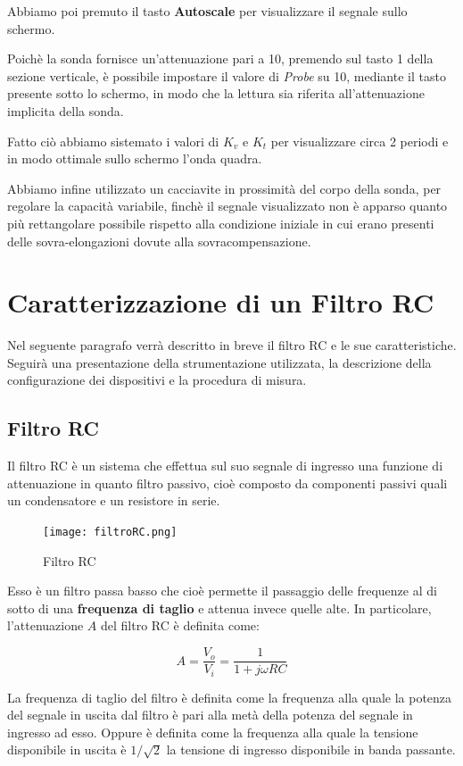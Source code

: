 Abbiamo poi premuto il tasto \textbf{Autoscale} per visualizzare il segnale sullo schermo.

Poichè la sonda fornisce un'attenuazione pari a 10, premendo sul tasto 1 della sezione verticale, è possibile impostare il valore di \emph{Probe} su 10, mediante il tasto presente sotto lo schermo, in modo che la lettura sia riferita all'attenuazione implicita della sonda.

Fatto ciò abbiamo sistemato i valori di $K_v$ e $K_t$ per visualizzare circa 2 periodi e in modo ottimale sullo schermo l'onda quadra.

Abbiamo infine utilizzato un cacciavite in prossimità del corpo della sonda, per regolare la capacità variabile, finchè il segnale visualizzato non è apparso quanto più rettangolare possibile rispetto alla condizione iniziale in cui erano presenti delle sovra-elongazioni dovute alla sovracompensazione.


\clearpage
\section{Caratterizzazione di un Filtro RC} \label{sec:filtroRC}
Nel seguente paragrafo verrà descritto in breve il filtro RC e le sue caratteristiche. Seguirà una presentazione della strumentazione utilizzata, la descrizione della configurazione dei dispositivi e la procedura di misura.

\subsection{Filtro RC}
Il filtro RC è un sistema che effettua sul suo segnale di ingresso una funzione di attenuazione in quanto filtro passivo, cioè composto da componenti passivi quali un condensatore e un resistore in serie.

\begin{figure}[h]
    \centering
    \texttt{[image: filtroRC.png]}
    \caption{Filtro RC}
    \label{fig:filtroRC}
\end{figure}
\FloatBarrier

Esso è un filtro passa basso che cioè permette il passaggio delle frequenze al di sotto di una \textbf{frequenza di taglio} e attenua invece quelle alte. In particolare, l'attenuazione $A$ del filtro RC è definita come:

\[A=\frac{V_o}{V_i}=\frac{1}{1+j\omega RC}\]

La frequenza di taglio del filtro è definita come la frequenza alla quale la potenza del segnale in uscita dal filtro è pari alla metà della potenza del segnale in ingresso ad esso. Oppure è definita come la frequenza alla quale la tensione disponibile in uscita è $1/\sqrt{2}$ la tensione di ingresso disponibile in banda passante.

